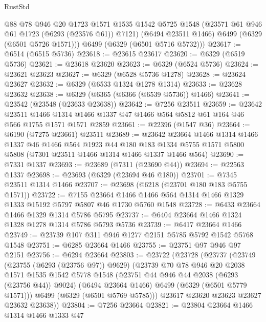 \begin{lexlean}{RustStd}
\begin{coremodule}
{{        @88
        @78
        @946
        @20
        @1723
        @1571
        @1535
        @1542
        @5725
        @1548
        (@23571 @61 @946 @61 @1723 (@6293 (@23576 @61)) @7121)
        (@6494 @23511 @1466)
        @6499
        (@6329 (@6501 @5726 @1571)))
      @6499
      (@6329 (@6501 @5716 @5732)))
@23617 := @6514 (@6515 @5736)
@23618 := @23615 @23617
@23620 := @6329 (@6519 @5736)
@23621 := @23618 @23620
@23623 := @6329 (@6524 @5736)
@23624 := @23621 @23623
@23627 := @6329 (@6528 @5736 @1278)
@23628 := @23624 @23627
@23632 := @6329 (@6533 @1324 @1278 @1314)
@23633 := @23628 @23632
@23638 := @6329 (@6365 (@6366 (@6539 @5736)) @1466)
@23641 := @23542 (@23548 (@23633 @23638))
@23642 := @7256 @23511
@23659 := @23642
    @23511
    @1466
    @1314
    @1466
    @1337
    @47
    @1466
    @564
    @5812
    @61
    @164
    @46
    @566
    @1755
    @1571
    @1571
    @2859
@23661 := @22396 (@1547 @36)
@23664 := @6190 (@7275 @23661) @23511
@23689 := @23642
    @23664
    @1466
    @1314
    @1466
    @1337
    @46
    @1466
    @564
    @1923
    @44
    @180
    @183
    @1334
    @5755
    @1571
    @5800
    @5808
    (@7301 @23511 @1466 @1314 @1466 @1337 @1466 @564)
@23690 := @7331 @1337
@23693 := @23689 (@7311 (@23690 @44))
@23694 := @22563 @1337
@23698 := @23693 (@6329 (@23694 @46 @180))
@23701 := @7345 @23511 @1314 @1466
@23707 := @23698 (@6218 (@23701 @180 @183 @5755 @1571))
@23722 := @7155
    @23664
    @1466
    @1466
    @564
    @1314
    @1466
    @1329
    @1333
    @15192
    @5797
    @5807
    @46
    @1730
    @5760
    @1548
@23728 := @6433 @23664 @1466 @1329 @1314 @5786 @5795
@23737 := @6404 @23664 @1466 @1324 @1328 @1278 @1314 @5786 @5793 @5736
@23739 := @6417 @23664 @1466
@23749 := @23739 @107 @311 @946 @1277 @2151 @5785 @5792 @1542 @5768 @1548
@23751 := @6285 @23664 @1466
@23755 := @23751 @97 @946 @97 @2151
@23756 := @6294 @23664
@23803 := @23722
    (@23728
      (@23737
        (@23749
          (@23755 (@6293 (@23756 @97)) @9629)
          (@23739
            @70
            @78
            @946
            @20
            @2038
            @1571
            @1535
            @1542
            @5778
            @1548
            (@23751 @44 @946 @44 @2038 (@6293 (@23756 @44)) @9024)
            (@6494 @23664 @1466)
            @6499
            (@6329 (@6501 @5779 @1571)))
          @6499
          (@6329 (@6501 @5769 @5785)))
        @23617
        @23620
        @23623
        @23627
        @23632
        @23638))
@23804 := @7256 @23664
@23821 := @23804
    @23664
    @1466
    @1314
    @1466
    @1333
    @47
}}
\end{coremodule}
\end{lexlean}
